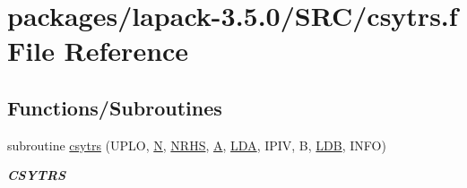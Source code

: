\hypertarget{csytrs_8f}{}\section{packages/lapack-\/3.5.0/\+S\+R\+C/csytrs.f File Reference}
\label{csytrs_8f}
\subsection*{Functions/\+Subroutines}
\begin{DoxyCompactItemize}
\item 
subroutine \hyperlink{group__complexSYcomputational_gabd38670b8caa9c8b2f0be9f0a7c14e38}{csytrs} (U\+P\+L\+O, \hyperlink{polmisc_8c_a0240ac851181b84ac374872dc5434ee4}{N}, \hyperlink{example__user_8c_aa0138da002ce2a90360df2f521eb3198}{N\+R\+H\+S}, \hyperlink{classA}{A}, \hyperlink{example__user_8c_ae946da542ce0db94dced19b2ecefd1aa}{L\+D\+A}, I\+P\+I\+V, B, \hyperlink{example__user_8c_a50e90a7104df172b5a89a06c47fcca04}{L\+D\+B}, I\+N\+F\+O)
\begin{DoxyCompactList}\small\item\em {\bfseries C\+S\+Y\+T\+R\+S} \end{DoxyCompactList}\end{DoxyCompactItemize}
